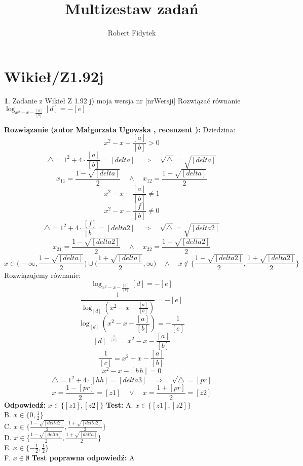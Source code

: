 \documentclass[12pt, a4paper]{article}
\title{Multizestaw zadań}
\author{Robert Fidytek}
\date{}
\theoremstyle{definition} %
\newtheorem{zad}{}
\newcommand{\kategoria}[1]{\section{#1}} %
\newcommand{\zadStart}[1]{\begin{zad}#1\newline} %
\newcommand{\zadStop}{\end{zad}}   %
\newcommand{\rozwStart}[2]{\noindent \textbf{Rozwiązanie (autor #1 , recenzent #2): }\newline} %
\newcommand{\rozwStop}{\newline}                                            %
\newcommand{\odpStart}{\noindent \textbf{Odpowiedź:}\newline}    %
\newcommand{\odpStop}{\newline}                                             %
\newcommand{\testStart}{\noindent \textbf{Test:}\newline} %
\newcommand{\testStop}{\newline} %
\newcommand{\kluczStart}{\noindent \textbf{Test poprawna odpowiedź:}\newline} %
\newcommand{\kluczStop}{\newline} %
\begin{document}
\maketitle


\kategoria{Wikieł/Z1.92j}
\zadStart{Zadanie z Wikieł Z 1.92 j) moja wersja nr [nrWersji]}
Rozwiązać równanie $\log_{x^2-x-\frac{[a]}{[b]}}{[d]}=-[e]$
\zadStop
\rozwStart{Małgorzata Ugowska}{}
Dziedzina:
$$x^2-x-\frac{[a]}{[b]}>0$$
$$ \bigtriangleup = 1^2 + 4 \cdot \frac{[a]}{[b]} = [delta] \quad  \Longrightarrow \quad \sqrt{\bigtriangleup} = \sqrt{[delta]}$$
$$x_{11}=\frac{1-\sqrt{[delta]}}{2} \quad \land \quad x_{12}=\frac{1+\sqrt{[delta]}}{2} $$
$$x^2-x-\frac{[a]}{[b]} \ne 1$$
$$x^2-x-\frac{[f]}{[b]} \ne 0$$
$$ \bigtriangleup = 1^2 + 4 \cdot \frac{[f]}{[b]} = [delta2] \quad  \Longrightarrow \quad \sqrt{\bigtriangleup} = \sqrt{[delta2]}$$
$$x_{21}=\frac{1-\sqrt{[delta2]}}{2} \quad \land \quad x_{22}=\frac{1+\sqrt{[delta2]}}{2} $$
$$x \in \Big(-\infty, \frac{1-\sqrt{[delta]}}{2}\Big) \cup \Big(\frac{1+\sqrt{[delta]}}{2}, \infty \Big) \quad \land \quad x \notin \Big\{\frac{1-\sqrt{[delta2]}}{2}, \frac{1+\sqrt{[delta2]}}{2} \Big\} $$
Rozwiązujemy równanie:
$$\log_{x^2-x-\frac{[a]}{[b]}}{[d]}=-[e]$$
$$\frac{1}{\log_{[d]}{(x^2-x-\frac{[a]}{[b]})}}=-[e]$$
$$\log_{[d]}{(x^2-x-\frac{[a]}{[b]})}=-\frac{1}{[e]}$$
$$[d]^{-\frac{1}{[e]}} = x^2-x-\frac{[a]}{[b]}$$
$$\frac{1}{[c]} = x^2-x-\frac{[a]}{[b]}$$
$$x^2-x-[hh] = 0$$
$$ \bigtriangleup = 1^2 + 4 \cdot [hh] = [delta3] \quad  \Longrightarrow \quad \sqrt{\bigtriangleup} = [pr]$$
$$x =\frac{1-[pr]}{2} = [z1] \quad \vee \quad x =\frac{1+[pr]}{2} =[z2]$$
\rozwStop
\odpStart
$x \in \{ [z1], [z2] \}$
\odpStop
\testStart
A. $x \in \{ [z1], [z2] \}$\\
B. $x \in \{ 0, \frac{1}{2} \}$\\
C. $x \in \Big\{\frac{1-\sqrt{[delta2]}}{2}, \frac{1+\sqrt{[delta2]}}{2} \Big\}$\\
D. $ x \in \Big\{\frac{1-\sqrt{[delta]}}{2}, \frac{1+\sqrt{[delta]}}{2} \Big\} $ \\
E. $x \in \{ -\frac{1}{2}, \frac{1}{2} \}$\\
F. $x \in \emptyset $
\testStop
\kluczStart
A
\kluczStop
\end{document}
